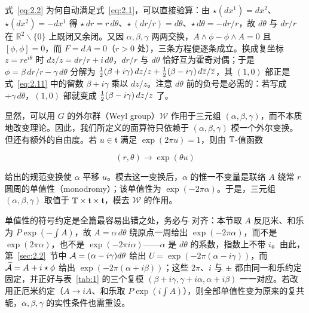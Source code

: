 \begin{yizhu}[含糊点拨]
式~\eqref{eq:2.2} 为何自动满足式~\eqref{eq:2.1}，可以直接验算：由 $\star(dx^1)=dx^2$、$\star(dx^2)=-dx^1$ 得 $\star\,dr=r\,d\theta$、$\star\,(dr/r)=d\theta$、$\star\,d\theta=-dr/r$，故 $d\theta$ 与 $dr/r$ 在 $\mathbb{R}^2\backslash\{0\}$ 上既闭又余闭。又因 $\alpha,\beta,\gamma$ 两两交换，$A\wedge\phi-\phi\wedge A=0$ 且 $[\phi,\phi]=0$，而 $F=dA=0$（$r>0$ 处），三条方程便逐条成立。换成复坐标 $z=re^{i\theta}$ 时 $dz/z=dr/r+i\,d\theta$，$dr/r$ 与 $d\theta$ 恰好互为霍奇对偶；于是 $\phi=\beta\,dr/r-\gamma\,d\theta$ 分解为 ${1\over2}(\beta+i\gamma)\,dz/z+{1\over2}(\beta-i\gamma)\,d\bar z/\bar z$，其 $(1,0)$ 部正是式~\eqref{eq:2.11} 中的留数 $\beta+i\gamma$ 乘以 $dz/z$。注意 $d\theta$ 前的负号是必需的：若写成 $+\gamma\,d\theta$，$(1,0)$ 部就变成 ${1\over2}(\beta-i\gamma)\,dz/z$ 了。
\end{yizhu}

显然，可以用 $G$ 的外尔群（Weyl group）${\mathcal W}$ 作用于三元组 $(\alpha,\beta,\gamma)$，而不本质地改变理论。因此，我们所定义的面算符只依赖于 $(\alpha,\beta,\gamma)$ 模一个外尔变换。但还有额外的自由度。若 $u\in \mathfrak t$ 满足 $\exp(2\pi u)=1$，则由 $\TT$-值函数

\setcounter{equation}{2}
\begin{equation}\label{eq:2.3}
  (r,\theta)\to \exp(\theta u)
\end{equation}

 给出的规范变换使 $\alpha$ 平移 $u$。模去这一变换后，$\alpha$ 的惟一不变量是联络 $A$ 绕常 $r$ 圆周的单值性（monodromy）；该单值性为 $\exp(-2\pi \alpha)$。于是，三元组 $(\alpha,\beta,\gamma)$ 取值于 $\TT\times {\mathfrak t}\times {\mathfrak t}$，模去 ${\mathcal W}$ 的作用。
\begin{yizhu}[易错点]
单值性的符号约定是全篇最容易出错之处，务必与 \cite{ref8} 对齐：本节取 $A$ 反厄米、和乐为 $P\exp(-\int A)$，故 $A=\alpha\,d\theta$ 绕原点一周给出 $\exp(-2\pi\alpha)$，而不是 $\exp(2\pi\alpha)$，也不是 $\exp(-2\pi i\alpha)$——$\alpha$ 是 $d\theta$ 的系数，指数上不带 $i$。由此，第~\ref{sec:2.2}~节中 $\CA=(\alpha-i\gamma)d\theta$ 给出 $U=\exp(-2\pi(\alpha-i\gamma))$，而 $\tilde\CA=A+i\star\phi$ 给出 $\exp(-2\pi(\alpha+i\beta))$；这些 $2\pi$、$i$ 与 $\pm$ 都由同一和乐约定固定，并正好与表~\ref{tab:1} 的三个复模 $(\beta+i\gamma,\gamma+i\alpha,\alpha+i\beta)$ 一一对应。若改用正厄米约定（$A\to iA$、和乐取 $P\exp(i\int A)$），则全部单值性变为原来的复共轭，$\alpha,\beta,\gamma$ 的实性条件也需重设。
\end{yizhu}

